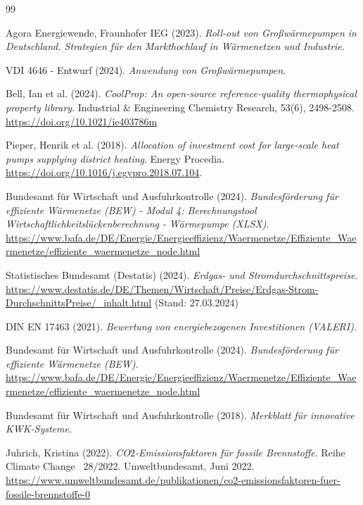\documentclass[letterpaper,11pt]{article}
\begin{document}
\newpage
\begin{thebibliography}{99} %
	
 Agora Energiewende, Fraunhofer IEG (2023). \textit{Roll-out von Großwärmepumpen in Deutschland. Strategien für den Markthochlauf in Wärmenetzen und Industrie}.

 VDI 4646 - Entwurf (2024). \textit{Anwendung von Großwärmepumpen}.

 Bell, Ian et al. (2024). \textit{CoolProp: An open-source reference-quality thermophysical property library}. Industrial \& Engineering Chemistry Research, 53(6), 2498-2508. \\
\url{https://doi.org/10.1021/ie403786m}

 Pieper, Henrik et al. (2018). \textit{Allocation of investment cost for large-scale heat pumps supplying district heating}. Energy Procedia. \\
\url{https://doi.org/10.1016/j.egypro.2018.07.104}.

 Bundesamt für Wirtschaft und Ausfuhrkontrolle (2024). \textit{Bundesförderung für effiziente Wärmenetze (BEW) - Modul 4: Berechnungstool Wirtschaftlichkeitslückenberechnung - Wärmepumpe (XLSX)}. \\
\url{https://www.bafa.de/DE/Energie/Energieeffizienz/Waermenetze/Effiziente_Waermenetze/effiziente_waermenetze_node.html}

 Statistisches Bundesamt (Destatis) (2024). \textit{Erdgas- und Stromdurchschnittspreise}. \\
\url{https://www.destatis.de/DE/Themen/Wirtschaft/Preise/Erdgas-Strom-DurchschnittsPreise/_inhalt.html} (Stand: 27.03.2024)

 DIN EN 17463 (2021). \textit{Bewertung von energiebezogenen Investitionen (VALERI)}.

 Bundesamt für Wirtschaft und Ausfuhrkontrolle (2024). \textit{Bundesförderung für effiziente Wärmenetze (BEW)}. \\
\url{https://www.bafa.de/DE/Energie/Energieeffizienz/Waermenetze/Effiziente_Waermenetze/effiziente_waermenetze_node.html}

 Bundesamt für Wirtschaft und Ausfuhrkontrolle (2018). \textit{Merkblatt für innovative KWK-Systeme}.

 Juhrich, Kristina (2022). \textit{CO$2$-Emissionsfaktoren für fossile Brennstoffe}. Reihe Climate Change \textbar\ 28/2022. Umweltbundesamt, Juni 2022. \\
\url{https://www.umweltbundesamt.de/publikationen/co2-emissionsfaktoren-fuer-fossile-brennstoffe-0}


\end{thebibliography}
\end{document}
